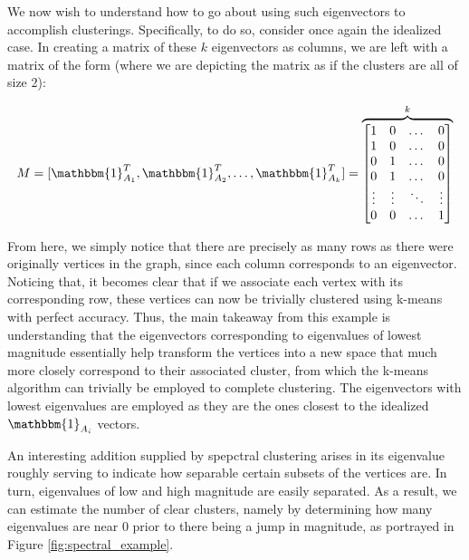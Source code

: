 \documentclass{article}
\begin{document}
We now wish to understand how to go about using such eigenvectors to accomplish clusterings. Specifically, to do so, consider once again the idealized case. In creating a matrix of these $k$ eigenvectors as columns, we are left with a matrix of the form (where we are depicting the matrix as if the clusters are all of size 2):

$$ M = [\mathbbm{1}_{A_1}^T,\mathbbm{1}_{A_2}^T,\dots,\mathbbm{1}_{A_k}^T] = 
\overbrace{\begin{bmatrix}
    1 & 0 & \dots & 0 \\
    1 & 0 & \dots & 0 \\
    0 & 1 & \dots & 0 \\
    0 & 1 & \dots & 0 \\
    \vdots & \vdots & \ddots & \vdots \\
    0 & 0 & \dots & 1
\end{bmatrix}}^{k}
$$

From here, we simply notice that there are precisely as many rows as there were originally vertices in the graph, since each column corresponds to an eigenvector. Noticing that, it becomes clear that if we associate each vertex with its corresponding row, these vertices can now be trivially clustered using k-means with perfect accuracy. Thus, the main takeaway from this example is understanding that the eigenvectors corresponding to eigenvalues of lowest magnitude essentially help transform the vertices into a new space that much more closely correspond to their associated cluster, from which the k-means algorithm can trivially be employed to complete clustering. The eigenvectors with lowest eigenvalues are employed as they are the ones closest to the idealized $\mathbbm{1}_{A_i}$ vectors. 

An interesting addition supplied by spepctral clustering arises in its eigenvalue roughly serving to indicate how separable certain subsets of the vertices are. In turn, eigenvalues of low and high magnitude are easily separated. As a result, we can estimate the number of clear clusters, namely by determining how many eigenvalues are near 0 prior to there being a jump in magnitude, as portrayed in Figure \ref{fig:spectral_example}.
\end{document}
